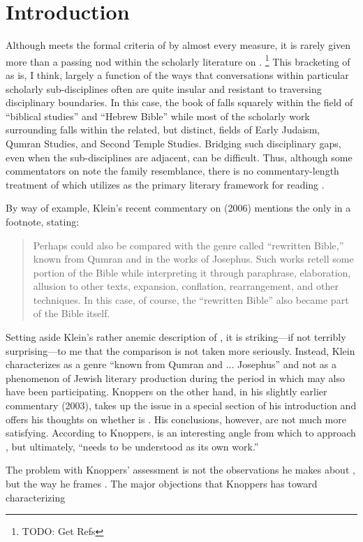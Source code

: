 \section{Introduction}

Although \chronicles meets the formal criteria of \rwb by almost every measure, it is rarely given more than a passing nod within the scholarly literature on \rwb.%
    \footnote{TODO: Get Refs}
This bracketing of \chronicles as \rwb is, I think, largely a function of the ways that conversations within particular scholarly sub-disciplines often are quite insular and resistant to traversing disciplinary boundaries. In this case, the book of \chronicles falls squarely within the field of ``biblical studies'' and ``Hebrew Bible'' while most of the scholarly work surrounding \rwb falls within the related, but distinct, fields of Early Judaism, Qumran Studies, and Second Temple Studies. Bridging such disciplinary gaps, even when the sub-disciplines are adjacent, can be difficult. Thus, although some commentators on \chronicles note the family resemblance, there is no commentary-length treatment of \chronicles which utilizes \rwb as the primary literary framework for reading \chronicles.

By way of example, Klein's recent commentary on \chronicles (2006) mentions the \rwb only in a footnote, stating:

\begin{quote}
    Perhaps \chronicles could also be compared with the genre called ``rewritten Bible,'' known from Qumran and in the works of Josephus. Such works retell some portion of the Bible while interpreting it through paraphrase, elaboration, allusion to other texts, expansion, conflation, rearrangement, and other techniques. In this case, of course, the ``rewritten Bible'' also became part of the Bible itself.\autocite[17 n.157]{klein2006}
\end{quote}

Setting aside Klein's rather anemic description of \rwb, it is striking---if not terribly surprising---to me that the comparison is not taken more seriously. Instead, Klein characterizes \rwb as a genre ``known from Qumran and ... Josephus'' and not as a phenomenon of Jewish literary production during the \secondtemple period in which \chronicles may also have been participating. Knoppers on the other hand, in his slightly earlier commentary (2003), takes up the issue in a special section of his introduction and offers his thoughts on whether \chronicles is \rwb.\autocite[129--134]{knoppers2003} His conclusions, however, are not much more satisfying. According to Knoppers, \rwb is an interesting angle from which to approach \chronicles, but ultimately, ``\chronicles needs to be understood as its own work.''\autocite[134]{knoppers2003} 

The problem with Knoppers' assessment is not the observations he makes about \chronicles, but the way he frames \rwb. The major objections that Knoppers has toward characterizing \chronicles
